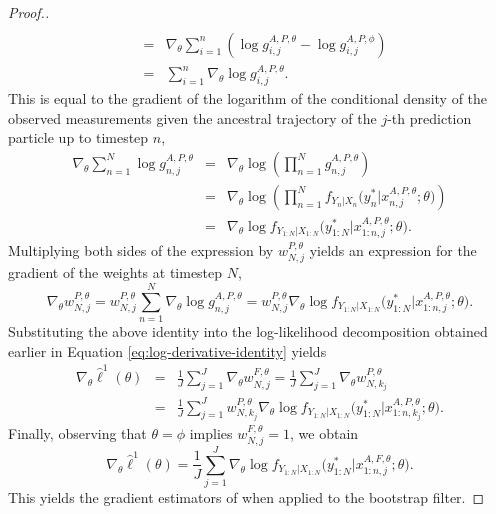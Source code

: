\begin{proof}[Proof.]
\begin{eqnarray}
 \\
 &=& \nabla_\theta \sum_{i=1}^n \left(\log g_{i,j}^{A,P,\theta} - \log g_{i,j}^{A,P,\phi}\right)
 \\
 &=& \sum_{i=1}^n \nabla_\theta \log g_{i,j}^{A,P,\theta}.
\end{eqnarray}
This is equal to the gradient of the logarithm of the conditional density of the observed measurements given the ancestral trajectory of the $j$-th prediction particle up to timestep $n$,
\begin{eqnarray}  
\nabla_\theta \sum_{n=1}^N \log g_{n,j}^{A,P,\theta} &=& \nabla_\theta \log\left(\prod_{n=1}^N g_{n,j}^{A,P,\theta}\right) 
\\
&=&  \nabla_\theta \log\left(\prod_{n=1}^N f_{Y_n|X_n}\big(y_n^* | x_{n,j}^{A, P,\theta};\theta\big)\right)
\\
&=& \nabla_\theta \log f_{Y_{1:N}|X_{1:N}}\big(y_{1:N}^* | x_{1:n,j}^{A, P,\theta};\theta\big).
\end{eqnarray}
Multiplying both sides of the expression by $w_{N,j}^{P,\theta} $ yields an expression for the gradient of the weights at timestep $N$,
\begin{equation}
\nabla_\theta w_{N,j}^{P,\theta} = w_{N,j}^{P,\theta} \sum_{n=1}^N \nabla_\theta \log g_{n,j}^{A,P,\theta} = w_{N,j}^{P,\theta} \nabla_\theta \log f_{Y_{1:N}|X_{1:N}}\big(y_{1:N}^* | x_{1:n,j}^{A, P,\theta};\theta\big).    
\end{equation}
Substituting the above identity into the log-likelihood decomposition obtained earlier in Equation \ref{eq:log-derivative-identity} yields
\begin{eqnarray}
    \nabla_\theta \hat{\ell}^1(\theta) &=& \frac{1}{J}\sum_{j=1}^J \nabla_\theta w_{N,j}^{F,\theta} =\frac{1}{J}\sum_{j=1}^J \nabla_\theta w_{N,k_j}^{P,\theta}
    \nonumber \\
    &=& \frac{1}{J}\sum_{j=1}^J w_{N,k_j}^{P,\theta} \nabla_\theta \log f_{Y_{1:N}|X_{1:N}}\big(y_{1:N}^* | x_{1:n,k_j}^{A, P,\theta};\theta \big).
\end{eqnarray}
Finally, observing that $\theta=\phi$ implies $w_{N,j}^{F,\theta}=1$, we obtain 
\begin{equation}
    \nabla_\theta \hat{\ell}^1(\theta) = \frac{1}{J}\sum_{j=1}^J \nabla_\theta \log f_{Y_{1:N}|X_{1:N}}\big(y_{1:N}^* | x_{1:n,j}^{A, F,\theta};\theta\big).
\end{equation}
This yields the gradient estimators of \cite{poyiadjis11, scibior21} when applied to the bootstrap filter. 
\end{proof}

